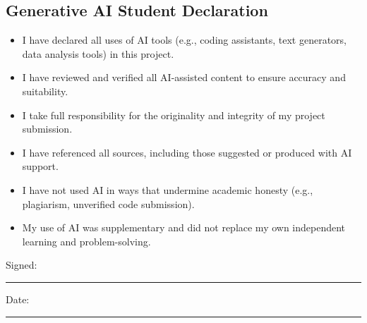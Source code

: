 \documentclass[conference]{IEEEtran}
\begin{document}
\subsection{Generative AI Student Declaration}

\begin{itemize}
\item I have declared all uses of AI tools (e.g., coding assistants, text generators, data analysis tools) in this project.
\item I have reviewed and verified all AI-assisted content to ensure accuracy and suitability.
\item I take full responsibility for the originality and integrity of my project submission.
\item I have referenced all sources, including those suggested or produced with AI support.
\item I have not used AI in ways that undermine academic honesty (e.g., plagiarism, unverified code submission).
\item My use of AI was supplementary and did not replace my own independent learning and problem-solving.
\end{itemize}

\vspace{2em}
\noindent Signed: \rule{6cm}{0.4pt} \hspace{1em} Date: \rule{5cm}{0.4pt}
\end{document}
